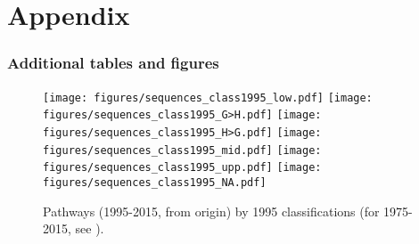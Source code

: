\documentclass[12pt]{article}
\begin{document}



\appendix
\part*{Appendix}
\label{appendix}

\section{Additional tables and figures}




\begin{figure}[htbp]
  \centering
  \caption{Pathways (1995-2015, from origin) by 1995 classifications (for 1975-2015, see ).}
  \label{sequences_class1995}
  \texttt{[image: figures/sequences\_class1995\_low.pdf]}
  \texttt{[image: figures/sequences\_class1995\_G>H.pdf]}
  \texttt{[image: figures/sequences\_class1995\_H>G.pdf]}
  \texttt{[image: figures/sequences\_class1995\_mid.pdf]}
  \texttt{[image: figures/sequences\_class1995\_upp.pdf]}
  \texttt{[image: figures/sequences\_class1995\_NA.pdf]}
\end{figure}
\end{document}
